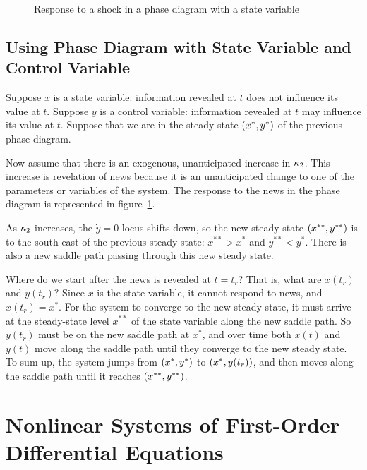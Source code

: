 \documentclass[letterpaper,12pt,leqno]{article}
\newcommand{\pdf}{phasediagrams.pdf}
\begin{document}
\begin{figure}[p]
\hfill
{}\vfig
{}\hfill
{}
\caption{Response to a shock in a phase diagram with a state variable}
\label{f:news}\end{figure}


\subsection{Using Phase Diagram with State Variable and Control Variable}

Suppose $x$ is a state variable: information revealed at $t$ does not influence its value at $t$. Suppose $y$ is a control variable: information revealed at $t$ may influence its value at $t$. Suppose that we are in the steady state $\left( x^{*},y^{*} \right)$ of the previous phase diagram. 

Now assume that there is an exogenous, unanticipated increase in $\kappa_{2}$. This increase is revelation of news because it is an unanticipated change to one of the parameters or variables of the system. The response to the news in the phase diagram is represented in figure~\ref{f:news}.

As $\kappa_{2}$ increases, the $\dot{y}=0$ locus shifts down, so the new steady state $\left( x^{* *},y^{* *} \right) $ is to the south-east of the previous steady state: $x^{* *}>x^{*}$ and $y^{* *}<y^{*}.$ There is also a new saddle path passing through this new steady state.

Where do we start after the news is revealed at $t=t_{r}$? That is, what are $x(t_{r})$ and $y(t_{r})$? Since $x$ is the state variable, it cannot respond to  news, and $x(t_{r})= x^{*}$. For the system to converge to the new steady state, it must arrive at the steady-state level $x^{* *}$ of the state variable along the new saddle path. So $y(t_{r})$ must be on the new saddle path at $x^{*}$, and over time both $x(t)$ and $y(t)$ move along the saddle path until they converge to the new steady state. To sum up, the system jumps from $\left( x^{*},y^{*} \right)$ to $\left( x^{*},y(t_{r}) \right)$, and then moves along the saddle path until it reaches $\left( x^{* *},y^{* *} \right)$.

\section{Nonlinear Systems of First-Order Differential Equations}
\end{document}
